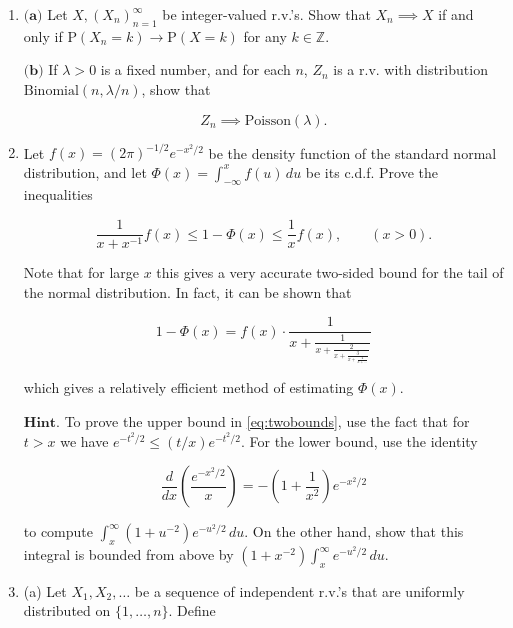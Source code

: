 \documentclass[11pt]{report}
\newcommand{\R}{\mathbb{R}}
\newcommand{\Z}{\mathbb{Z}}
\theoremstyle{plain}
\theoremstyle{definition}
\begin{document}
\begin{enumerate}[label=\arabic*.]
$\textbf{(b)}$ Prove that if $X_n \implies c$ where
$c\in \R$ is a constant, then $X_n \to c$ in
probability.

$\textbf{(c)}$ Prove that if
$Z, (X_n)_{n=1}^\infty, (Y_n)_{n=1}^\infty$ are
random variables such that $X_n \implies Z$ and
$X_n-Y_n\to 0$ in probability, then $Y_n \implies Z$.

\item $\textbf{(a)}$ Let $X, (X_n)_{n=1}^\infty$ be
integer-valued r.v.'s. Show that $X_n\implies X$ if
and only if $\mathrm{P}(X_n=k)\to \mathrm{P}(X=k)$
for any $k\in\Z$.

$\textbf{(b)}$ If $\lambda >0$ is a fixed number, and
for each $n$, $Z_n$ is a r.v. with distribution
$\textrm{Binomial}(n,\lambda/n)$, show that

\[
Z_n \implies \textrm{Poisson}(\lambda).
\]

\item Let $f(x) = (2\pi)^{-1/2} e^{-x^2/2}$ be the density
function of the standard normal distribution, and let
$\Phi(x) = \int_{-\infty}^x f(u)\,du$ be its c.d.f.
Prove the inequalities

\begin{equation*}
\tag{28}\label{eq:twobounds}
\frac{1}{x+x^{-1}}f(x) \le 1-\Phi(x) \le \frac{1}{x} f(x), \qquad (x>0).
\end{equation*}

\noindent Note that for large $x$ this gives a very accurate
two-sided bound for the tail of the normal
distribution. In fact, it can be shown that

\[
1-\Phi(x) = f(x) \cdot \frac{1}{x+\frac{1}{x+\frac{2}{x+\frac{3}{x+\frac{4}{x+\ldots}}}}}
\]

\noindent which gives a relatively efficient method of
estimating $\Phi(x)$.

$\textbf{Hint.}$ To prove the upper bound in
\eqref{eq:twobounds}, use the fact that for $t>x$ we have
$e^{-t^2/2} \le (t/x)e^{-t^2/2}$. For the lower
bound, use the identity

\[
\frac{d}{dx}\left(\frac{e^{-x^2/2}}{x}\right) = -\left(1+\frac{1}{x^2}\right) e^{-x^2/2}
\]

\noindent to compute $\int_x^\infty (1+u^{-2})e^{-u^2/2}\,du$.
On the other hand, show that this integral is bounded
from above by
$(1+x^{-2})\int_x^{\infty} e^{-u^2/2}\,du$.

\item (a) Let $X_1, X_2, \ldots$ be a sequence of
independent r.v.'s that are uniformly distributed on
$\{1,\ldots,n\}$. Define


\end{enumerate}
\end{document}

